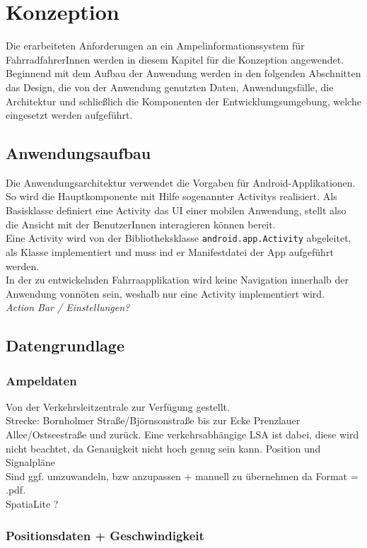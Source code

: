 \chapter{\label{chap:entwurf}Konzeption}
Die erarbeiteten Anforderungen an ein Ampelinformationssystem für FahrradfahrerInnen werden in diesem Kapitel für die Konzeption angewendet. Beginnend mit dem Aufbau der Anwendung werden in den folgenden Abschnitten das Design, die von der Anwendung genutzten Daten, Anwendungsfälle, die Architektur und schließlich die Komponenten der Entwicklumgsumgebung, welche eingesetzt werden aufgeführt. 
\section{Anwendungsaufbau}
Die Anwendungsarchitektur verwendet die Vorgaben für Android-Applikationen. So wird die Hauptkomponente mit Hilfe sogenannter \glspl{Activity} realisiert. Als Basisklasse definiert eine \gls{Activity} das \gls{UI} einer mobilen Anwendung, stellt also die Ansicht mit der BenutzerInnen interagieren können bereit.\\
Eine \gls{Activity} wird von der Bibliotheksklasse \texttt{android.app.Activity} abgeleitet, als Klasse implementiert und muss ind er Manifestdatei der \gls{App} aufgeführt werden. \cite{android_activity} \\
In der zu entwickelnden Fahrraapplikation wird keine Navigation innerhalb der Anwendung vonnöten sein, weshalb nur eine \gls{Activity} implementiert wird.\\
\textit{Action Bar / Einstellungen?}
\section{Datengrundlage}
\subsection{Ampeldaten}
Von der Verkehrsleitzentrale zur Verfügung gestellt.\\
Strecke: Bornholmer Straße/Björnsonstraße bis zur Ecke Prenzlauer Allee/Ostseestraße und zurück. 
Eine verkehrsabhängige \gls{LSA} ist dabei, diese wird nicht beachtet, da Genauigkeit nicht hoch genug sein kann.
Position und Signalpläne\\
Sind ggf. umzuwandeln, bzw anzupassen + manuell zu übernehmen da Format = .pdf.\\
SpatiaLite ?
\subsection{Positionsdaten + Geschwindigkeit}
